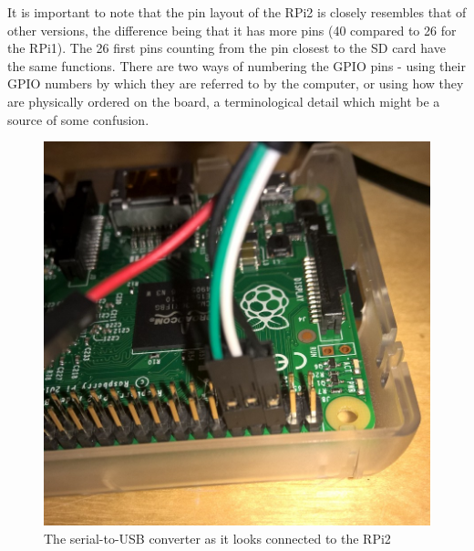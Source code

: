 \documentclass[a4paper,11pt,reqno]{amsart}
\begin{document}
It is important to note that the pin layout of the RPi2 is closely resembles that of other versions, the difference being that it has more pins (40 compared to 26 for the RPi1). The 26 first pins counting from the pin closest to the SD card have the same functions. There are two ways of numbering the GPIO pins - using their GPIO numbers by which they are referred to by the computer, or using how they are physically ordered on the board, a terminological detail which might be a source of some confusion.
\begin{figure}[hb]
\begin{center}
   \includegraphics[scale=0.3]{connection.png}
 \end{center}
 \caption{The serial-to-USB converter as it looks connected to the RPi2}
 \label{fig:conn}
\end{figure}
\end{document}
